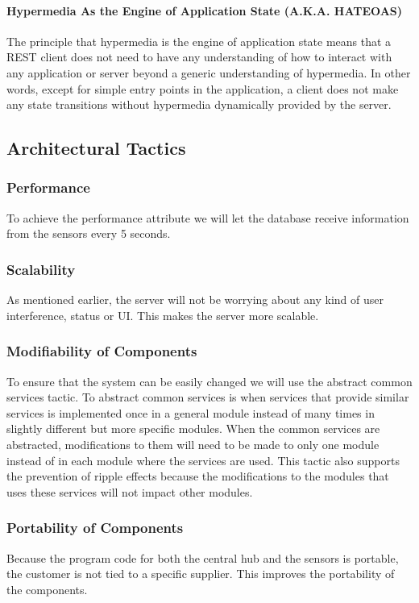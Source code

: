 \documentclass[../document.tex]{subfiles}
\begin{document}
\paragraph{Hypermedia As the Engine of Application State (A.K.A. HATEOAS)}
The principle that hypermedia is the engine of application state means that a REST client does not need to have any understanding of how to interact with any application or server beyond a generic understanding of hypermedia. In other words, except for simple entry points in the application, a client does not make any state transitions without hypermedia dynamically provided by the server. 

\subsection{Architectural Tactics}
\subsubsection{Performance}
To achieve the performance attribute we will let the database receive information from the sensors every 5 seconds. 

\subsubsection{Scalability}
As mentioned earlier, the server will not be worrying about any kind of user interference, status or UI. This makes the server more scalable.

\subsubsection{Modifiability of Components}
To ensure that the system can be easily changed we will use the abstract common services tactic. To abstract common services is when services that provide similar services is implemented once in a general module instead of many times in slightly different but more specific modules. When the common services are abstracted, modifications to them will need to be made to only one module instead of in each module where the services are used. This tactic also supports the prevention of ripple effects because the modifications to the modules that uses these services will not impact other modules.

\subsubsection{Portability of Components}
Because the program code for both the central hub and the sensors is portable, the customer is not tied to a specific supplier. This improves the portability of the components.
\end{document}

